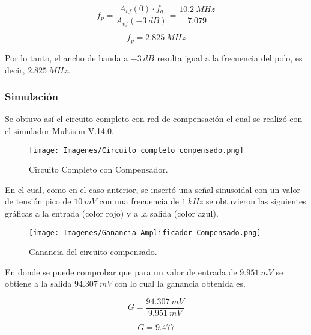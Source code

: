\documentclass[12pt,A4paper,titlepage]{article}
\begin{document}
\begin{equation}
    f_p = \frac{A_{vf} (0) \cdot f_g}{A_{vf}(-3~dB)} = \frac{10.2~MHz}{7.079}
\end{equation}

\begin{equation}
    \boxed{
    f_p = 2.825~MHz
    }
\end{equation}

\hspace{1mm} Por lo tanto, el ancho de banda a \(-3~dB\) resulta igual a la frecuencia del polo, es decir, \(2.825~MHz\).

\subsubsection{Simulación}

\hspace{1mm} Se obtuvo así el circuito completo con red de compensación el cual se realizó con el simulador Multisim V.14.0.

\begin{figure}[!h]
    \centering
    \texttt{[image: Imagenes/Circuito completo compensado.png]}
    \caption{Circuito Completo con Compensador.}
\end{figure}

\hspace{1mm} En el cual, como en el caso anterior, se insertó una señal sinusoidal con un valor de tensión pico de \(10~mV\) con una frecuencia de \( 1~kHz \) se obtuvieron las siguientes gráficas a la entrada (color rojo) y a la salida (color azul).

\begin{figure}[!h]
    \centering
    \texttt{[image: Imagenes/Ganancia Amplificador Compensado.png]}
    \caption{Ganancia del circuito compensado.}
\end{figure}

\hspace{1mm} En donde se puede comprobar que para un valor de entrada de \( 9.951~mV \) se obtiene a la salida \( 94.307~mV \) con lo cual la ganancia obtenida es.

\begin{equation}
    G = \frac{94.307~mV}{9.951~mV}
\end{equation}

\begin{equation}
    \boxed{
    G = 9.477
    }
\end{equation}
\end{document}
